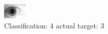 \begin{figure}[h!]
\begin{center}
\includegraphics[width=0.60\columnwidth]{figures/ID1957_class_4_target_3.png}
\end{center}
\caption{ Classification: 4 actual target: 3}
\label{fig:ID1957_class_4_target_3}
\end{figure}
